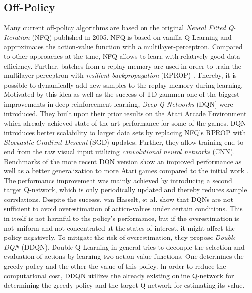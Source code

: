  	\subsection{Off-Policy \label{sec:off-policy}}
	Many current off-policy algorithms are based on the original \textit{Neural Fitted Q-Iteration} (NFQ) \cite{Riedmiller2005} published in 2005. 
	NFQ is based on vanilla Q-Learning \cite{Watkins1989} and approximates the action-value function with a multilayer-perceptron.
	Compared to other approaches at the time, NFQ allows to learn with relatively good data efficiency.
	Further, batches from a replay memory \cite{Lin1992} are used in order to train the multilayer-perceptron with \textit{resilient backpropagation} (RPROP) \cite{Riedmiller1993}.
	Thereby, it is possible to dynamically add new samples to the replay memory during learning.
	Motivated by this idea as well as the success of TD-gammon \cite{Tesauro1994} one of the biggest improvements in deep reinforcement learning, \textit{Deep Q-Networks} (DQN) \cite{Mnih2015} were introduced.   
	They built upon their prior results \cite{Mnih2013} on the Atari Arcade Environment \cite{Bellemare2013} which already achieved state-of-the-art performance for some of the games.
	DQN introduces better scalability to larger data sets by replacing NFQ's RPROP with \textit{Stochastic Gradient Descent} (SGD) updates. 
	Further, they allow training end-to-end from the raw visual input utilizing \textit{convolutional neural networks} (CNN). 
	Benchmarks of the more recent DQN version \cite{Mnih2015} show an improved performance as well as a better generalization to more Atari games compared to the initial work \cite{Mnih2013}.
	The performance improvement was mainly achieved by introducing a second target Q-network, which is only periodically updated and thereby reduces sample correlations. 
	Despite the success, van Hasselt, et al. \cite{VanHasselt2016} show that DQNs are not sufficient to avoid overestimation of action-values under certain conditions. 
	This in itself is not harmful to the policy's performance, but if the overestimation is not uniform and not concentrated at the states of interest, it might affect the policy negatively. 
	To mitigate the risk of overestimation, they propose \textit{Double DQN} (DDQN).
	Double Q-Learning \cite{VanHasselt2010} in general tries to decouple the selection and evaluation of actions by learning two action-value functions. 
	One determines the greedy policy and the other the value of this policy.  
	In order to reduce the computational cost, DDQN utilizes the already existing online Q-network for determining the greedy policy and the target Q-network for estimating its value. 
